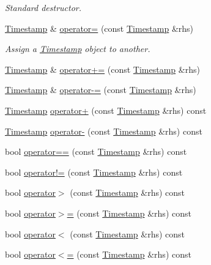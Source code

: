\begin{DoxyCompactItemize}
\begin{DoxyCompactList}\small\item\em Standard destructor. \end{DoxyCompactList}\item 
\hyperlink{class_timestamp}{Timestamp} \& \hyperlink{class_timestamp_ae97a897474c2a0b3c14b96c21bcddb12}{operator=} (const \hyperlink{class_timestamp}{Timestamp} \&rhs)
\begin{DoxyCompactList}\small\item\em Assign a \hyperlink{class_timestamp}{Timestamp} object to another. \end{DoxyCompactList}\item 
\hyperlink{class_timestamp}{Timestamp} \& \hyperlink{class_timestamp_a75b30341805c05e8875b9f0caaaa5f1d}{operator+=} (const \hyperlink{class_timestamp}{Timestamp} \&rhs)
\item 
\hyperlink{class_timestamp}{Timestamp} \& \hyperlink{class_timestamp_ad8ac2cf2eebb081ba04f61f1663373f7}{operator-\/=} (const \hyperlink{class_timestamp}{Timestamp} \&rhs)
\item 
\hyperlink{class_timestamp}{Timestamp} \hyperlink{class_timestamp_a18c4e9ba6a580961856082ac72294339}{operator+} (const \hyperlink{class_timestamp}{Timestamp} \&rhs) const 
\item 
\hyperlink{class_timestamp}{Timestamp} \hyperlink{class_timestamp_ad2ecf3fc732c5609983d797331810e11}{operator-\/} (const \hyperlink{class_timestamp}{Timestamp} \&rhs) const 
\item 
bool \hyperlink{class_timestamp_ab3aeec868b34b270b40dde4d0154b3ae}{operator==} (const \hyperlink{class_timestamp}{Timestamp} \&rhs) const 
\item 
bool \hyperlink{class_timestamp_ad64979a3dc3387f1feb1cf76a1e001bf}{operator!=} (const \hyperlink{class_timestamp}{Timestamp} \&rhs) const 
\item 
bool \hyperlink{class_timestamp_a317c3ee11406c668d30aaf27651e1237}{operator$>$} (const \hyperlink{class_timestamp}{Timestamp} \&rhs) const 
\item 
bool \hyperlink{class_timestamp_a88f7835430f39681c59400736f83a4b9}{operator$>$=} (const \hyperlink{class_timestamp}{Timestamp} \&rhs) const 
\item 
bool \hyperlink{class_timestamp_a2f0739b9dd635edba62c42cea65c387b}{operator$<$} (const \hyperlink{class_timestamp}{Timestamp} \&rhs) const 
\item 
bool \hyperlink{class_timestamp_a63e2e0474bbe971c2db2ab726408d203}{operator$<$=} (const \hyperlink{class_timestamp}{Timestamp} \&rhs) const 

\end{DoxyCompactItemize}

